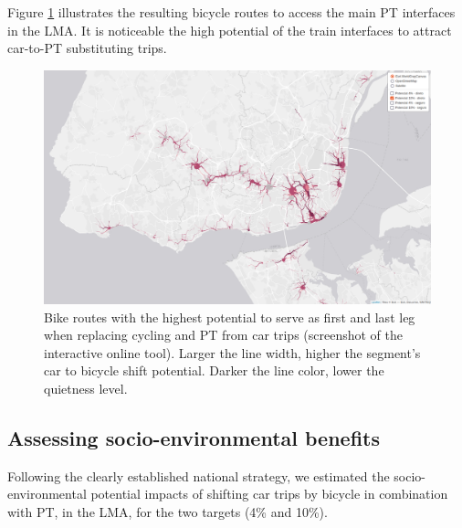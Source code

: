 \documentclass[review, doubleblind, 3p,
authoryear]{elsarticle} %
\begin{document}
Figure \ref{fig:map2} illustrates the resulting bicycle routes to access
the main PT interfaces in the LMA. It is noticeable the high potential
of the train interfaces to attract car-to-PT substituting trips.

\begin{figure}

{\centering \includegraphics[width=0.8\linewidth,]{img/map2} 

}

\caption{Bike routes with the highest potential to serve as first and last leg when replacing cycling and PT from car trips (screenshot of the interactive online tool). Larger the line width, higher the segment's car to bicycle shift potential. Darker the line color, lower the quietness level.}\label{fig:map2}
\end{figure}

\subsection{Assessing socio-environmental
benefits}\label{assessing-socio-environmental-benefits}

Following the clearly established national strategy, we estimated the
socio-environmental potential impacts of shifting car trips by bicycle
in combination with PT, in the LMA, for the two targets (4\% and 10\%).
\end{document}
